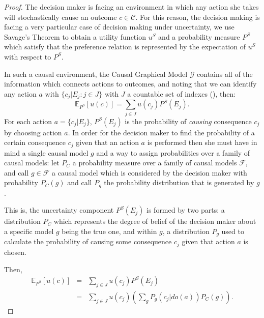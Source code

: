 \documentclass{article}
\theoremstyle{plain}
\begin{document}
\begin{proof}
The decision maker is facing an environment in which any action she takes will stochastically cause an outcome $c \in \mathcal{C}$. For this reason, the decision making is facing a very particular case of decision making under uncertainty, we use Savage's Theorem to obtain a utility function $u^S$ and a probability measure $P^S$ which satisfy that the preference relation is represented by the expectation of $u^S$ with respect to $P^S$. 

In such a causal environment, the Causal Graphical Model $\mathcal{G}$ contains all of the information which connects actions to outcomes, and noting that we can identify any action $a$ with $\{ c_j | E_j : j \in J  \}$ with $J$ a countable set of indexes (\cite{bernardo2000bayesian}), then:
\[\mathbb{E}_{P^S}[u(c)] = \sum_{j \in J} u(c_j)P^S(E_j).\]
For each action $a=\{ c_j | E_j \}$, $P^S(E_j)$ is the probability of \textit{causing} consequence $c_j$ by choosing action $a$. In order for the decision maker to find the probability of a certain consequence $c_j$ given that an action $a$ is performed then she must have in mind a single causal model $g$ and a way to assign probabilities over a family of causal models: let $P_C$ a probability measure over a family of causal models $\mathcal{F}$, and call $g \in \mathcal{F}$ a causal model which is considered by the decision maker with probability $P_C(g)$ and call $P_g$ the probability distribution that is generated by $g$. 

This is, the uncertainty component $P^S(E_j)$ is formed by two parts: a distribution $P_C$ which represents the degree of belief of the decision maker about a specific model $g$ being the true one, and within $g$, a distribution $P_g$ used to calculate the probability of causing some consequence $c_j$ given that action $a$ is chosen.

Then,
\begin{eqnarray}
\mathbb{E}_{P^S}[u(c)] &=& \sum_{j \in J} u(c_j)P^S(E_j)\\
                                      &=& \sum_{j \in J} u(c_j) \left( \sum_g P_g(c_j | do(a))P_C(g) \right).
\end{eqnarray}
\end{proof}
\end{document}
